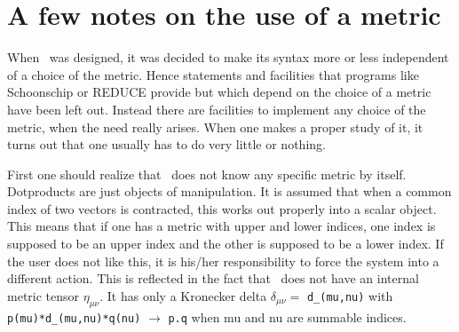 
\chapter{A few notes on the use of a metric}
\label{metric}

\noindent When \FORM\ was designed, it was decided to make its syntax more or 
less independent of a choice of the metric. Hence statements 
and facilities that programs like Schoonschip or 
REDUCE provide but which depend on the choice of a metric 
have been left out. Instead there are facilities to implement any choice of 
the metric, when the need really arises. When one makes a proper study of 
it, it turns out that one usually has to do very little or nothing. \hfill 
\vspace{2mm}

\noindent First one should realize that \FORM\ does not know any specific 
metric by itself. Dotproducts are just objects of manipulation. It is 
assumed that when a common index of two vectors is contracted, this works 
out properly into a scalar object. This means that if one has a metric with 
upper and lower indices, one 
index is supposed to be an upper index and the other is supposed to be a 
lower index. If the user does not like this, it is his/her responsibility 
to force the system into a different action. This is reflected in the fact 
that \FORM\ does not have an internal metric tensor 
$\eta_{\mu\nu}$. It has only a Kronecker 
delta $\delta_{\mu\nu} =$ \verb:d_(mu,nu): with 
\verb:p(mu)*d_(mu,nu)*q(nu): $\rightarrow$ \verb:p.q: when mu and nu are 
summable indices. \hfill \vspace{2mm}

